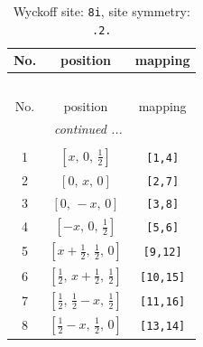 \documentclass[fleqn,8pt]{jsarticle}
\begin{document}
\begin{longtable}{ccc}
\caption{Wyckoff site: {\tt 8i}, site symmetry: {\tt .2.}}
 \\
 \hline \hline
No. & position & mapping \\ \hline \endfirsthead

\multicolumn{2}{l}{\tablename\ \thetable{}} \\
 \hline \hline
No. & position & mapping \\ \hline \endhead

 \hline \hline
\multicolumn{2}{r}{\footnotesize\it continued ...} \\ \endfoot

 \hline \hline
\multicolumn{2}{r}{} \\ \endlastfoot

1 & $\left[ x,\, 0,\, \frac{1}{2} \right]$ & {\tt [1,4]} \\ \hline
2 & $\left[ 0,\, x,\, 0 \right]$ & {\tt [2,7]} \\ \hline
3 & $\left[ 0,\, - x,\, 0 \right]$ & {\tt [3,8]} \\ \hline
4 & $\left[ - x,\, 0,\, \frac{1}{2} \right]$ & {\tt [5,6]} \\ \hline
5 & $\left[ x + \frac{1}{2},\, \frac{1}{2},\, 0 \right]$ & {\tt [9,12]} \\ \hline
6 & $\left[ \frac{1}{2},\, x + \frac{1}{2},\, \frac{1}{2} \right]$ & {\tt [10,15]} \\ \hline
7 & $\left[ \frac{1}{2},\, \frac{1}{2} - x,\, \frac{1}{2} \right]$ & {\tt [11,16]} \\ \hline
8 & $\left[ \frac{1}{2} - x,\, \frac{1}{2},\, 0 \right]$ & {\tt [13,14]} \\
\end{longtable}
\renewcommand{\arraystretch}{1.2}
\end{document}
